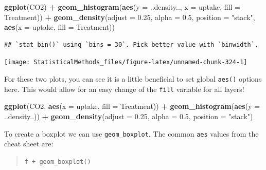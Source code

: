 \documentclass[
]{book}
\newenvironment{Shaded}{\begin{snugshade}}{\end{snugshade}}
\newcommand{\DataTypeTok}[1]{\textcolor[rgb]{0.13,0.29,0.53}{#1}}
\newcommand{\FloatTok}[1]{\textcolor[rgb]{0.00,0.00,0.81}{#1}}
\newcommand{\KeywordTok}[1]{\textcolor[rgb]{0.13,0.29,0.53}{\textbf{#1}}}
\newcommand{\NormalTok}[1]{#1}
\newcommand{\OperatorTok}[1]{\textcolor[rgb]{0.81,0.36,0.00}{\textbf{#1}}}
\newcommand{\StringTok}[1]{\textcolor[rgb]{0.31,0.60,0.02}{#1}}
\theoremstyle{definition}
\theoremstyle{definition}
\theoremstyle{definition}
\theoremstyle{remark}
\begin{document}
\begin{Shaded}
\begin{Highlighting}[]
\KeywordTok{ggplot}\NormalTok{(CO2) }\OperatorTok{+}\StringTok{ }
\StringTok{  }\KeywordTok{geom_histogram}\NormalTok{(}\KeywordTok{aes}\NormalTok{(}\DataTypeTok{y =}\NormalTok{ ..density.., }\DataTypeTok{x =}\NormalTok{ uptake, }\DataTypeTok{fill =}\NormalTok{ Treatment)) }\OperatorTok{+}
\StringTok{  }\KeywordTok{geom_density}\NormalTok{(}\DataTypeTok{adjust =} \FloatTok{0.25}\NormalTok{, }\DataTypeTok{alpha =} \FloatTok{0.5}\NormalTok{, }\DataTypeTok{position =} \StringTok{"stack"}\NormalTok{, }
               \KeywordTok{aes}\NormalTok{(}\DataTypeTok{x =}\NormalTok{ uptake, }\DataTypeTok{fill =}\NormalTok{ Treatment)) }
\end{Highlighting}
\end{Shaded}

\begin{verbatim}
## `stat_bin()` using `bins = 30`. Pick better value with `binwidth`.
\end{verbatim}

\begin{center}\texttt{[image: StatisticalMethods\_files/figure-latex/unnamed-chunk-324-1]} \end{center}

For these two plots, you can see it is a little beneficial to set global \texttt{aes()} options here. This would allow for an easy change of the \texttt{fill} variable for all layers!

\begin{Shaded}
\begin{Highlighting}[]
\KeywordTok{ggplot}\NormalTok{(CO2, }\KeywordTok{aes}\NormalTok{(}\DataTypeTok{x =}\NormalTok{ uptake, }\DataTypeTok{fill =}\NormalTok{ Treatment)) }\OperatorTok{+}\StringTok{ }
\StringTok{  }\KeywordTok{geom_histogram}\NormalTok{(}\KeywordTok{aes}\NormalTok{(}\DataTypeTok{y =}\NormalTok{ ..density..)) }\OperatorTok{+}
\StringTok{  }\KeywordTok{geom_density}\NormalTok{(}\DataTypeTok{adjust =} \FloatTok{0.25}\NormalTok{, }\DataTypeTok{alpha =} \FloatTok{0.5}\NormalTok{, }\DataTypeTok{position =} \StringTok{"stack"}\NormalTok{)}
\end{Highlighting}
\end{Shaded}

To create a boxplot we can use \texttt{geom\_boxplot}. The common \texttt{aes} values from the cheat sheet are:

\begin{quote}
\texttt{f\ +\ geom\_boxplot()}
\end{quote}
\end{document}
